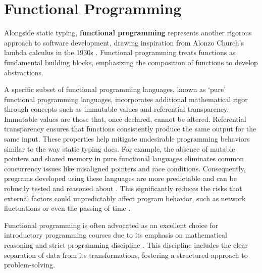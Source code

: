 \section{Functional Programming}

Alongside static typing, \textbf{functional programming} represents another rigorous approach to software development, drawing inspiration from Alonzo Church's lambda calculus in the 1930s \cite{Church1985-bx}. Functional programming treats functions as fundamental building blocks, emphasizing the composition of functions to develop abstractions.


 A specific subset of functional programming languages, known as `pure' functional programming languages, incorporates additional mathematical rigor through concepts such as immutable values and referential transparency. Immutable values are those that, once declared, cannot be altered. Referential transparency ensures that functions consistently produce the same output for the same input. These properties help mitigate undesirable programming behaviors similar to the way static typing does. For example, the absence of mutable pointers and shared memory in pure functional languages eliminates common concurrency issues like misaligned pointers and race conditions. Consequently, programs developed using these languages are more predictable and can be robustly tested and reasoned about \cite{Hu2015-ch}. This significantly reduces the risks that external factors could unpredictably affect program behavior, such as network fluctuations or even the passing of time \cite{Suzuki2019-bi}.

Functional programming is often advocated as an excellent choice for introductory programming courses due to its emphasis on mathematical reasoning and strict programming discipline \cite{Joosten1993-be, Chakravarty2004-ux}. This discipline includes the clear separation of data from its transformations, fostering a structured approach to problem-solving.



